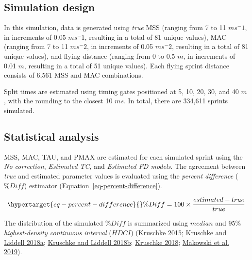 \documentclass[
  letterpaper,
  DIV=11,
  numbers=noendperiod]{scrartcl}
\begin{document}
\hypertarget{simulation-design}{%
\subsection{Simulation design}\label{simulation-design}}

In this simulation, data is generated using \emph{true} MSS (ranging
from 7 to 11 \(ms^-1\), in increments of 0.05 \(ms^-1\), resulting in a
total of 81 unique values), MAC (ranging from 7 to 11 \(ms^-2\), in
increments of 0.05 \(ms^-2\), resulting in a total of 81 unique values),
and flying distance (ranging from 0 to 0.5 \(m\), in increments of 0.01
\(m\), resulting in a total of 51 unique values). Each flying sprint
distance consists of 6,561 MSS and MAC combinations.

Split times are estimated using timing gates positioned at 5, 10, 20,
30, and 40 \(m\), with the rounding to the closest 10 \(ms\). In total,
there are 334,611 sprints simulated.

\hypertarget{statistical-analysis}{%
\subsection{Statistical analysis}\label{statistical-analysis}}

MSS, MAC, TAU, and PMAX are estimated for each simulated sprint using
the \emph{No correction}, \emph{Estimated TC}, and \emph{Estimated FD
models}. The agreement between \emph{true} and estimated parameter
values is evaluated using the \emph{percent difference} (\(\%Diff\))
estimator (Equation~\ref{eq-percent-difference}).

\begin{equation}\protect\hypertarget{eq-percent-difference}{}{
  \%Diff = 100 \times \frac{estimated - true}{true}
}\label{eq-percent-difference}\end{equation}

The distribution of the simulated \(\%Diff\) is summarized using
\(median\) and 95\% \emph{highest-density continuous interval}
(\(HDCI\))
(\protect\hyperlink{ref-kruschkeDoingBayesianData2015}{Kruschke 2015};
\protect\hyperlink{ref-kruschkeBayesianDataAnalysis2018}{Kruschke and
Liddell 2018a};
\protect\hyperlink{ref-kruschkeBayesianNewStatistics2018}{Kruschke and
Liddell 2018b};
\protect\hyperlink{ref-kruschkeRejectingAcceptingParameter2018}{Kruschke
2018};
\protect\hyperlink{ref-makowskiBayestestRDescribingEffects2019}{Makowski
et al. 2019}).
\end{document}
